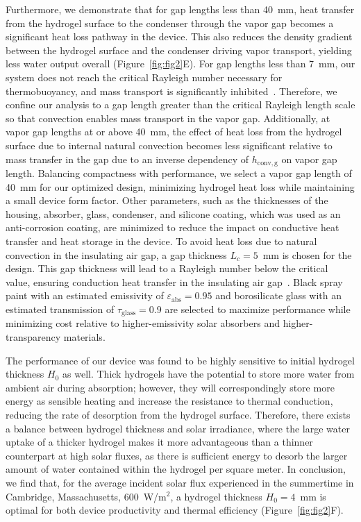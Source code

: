 \documentclass[11pt]{article}
\begin{document}
Furthermore, we demonstrate that for gap lengths less than 40~mm, heat transfer from the hydrogel surface to the condenser through the vapor gap becomes a significant heat loss pathway in the device. This also reduces the density gradient between the hydrogel surface and the condenser driving vapor transport, yielding less water output overall (Figure~\ref{fig:fig2}E). For gap lengths less than 7~mm, our system does not reach the critical Rayleigh number necessary for thermobuoyancy, and mass transport is significantly inhibited~\cite{hollands1976}. Therefore, we confine our analysis to a gap length greater than the critical Rayleigh length scale so that convection enables mass transport in the vapor gap. Additionally, at vapor gap lengths at or above 40~mm, the effect of heat loss from the hydrogel surface due to internal natural convection becomes less significant relative to mass transfer in the gap due to an inverse dependency of $h_{\mathrm{conv,g}}$ on vapor gap length. Balancing compactness with performance, we select a vapor gap length of 40~mm for our optimized design, minimizing hydrogel heat loss while maintaining a small device form factor. Other parameters, such as the thicknesses of the housing, absorber, glass, condenser, and silicone coating, which was used as an anti-corrosion coating, are minimized to reduce the impact on conductive heat transfer and heat storage in the device. To avoid heat loss due to natural convection in the insulating air gap, a gap thickness $L_c = 5$~mm is chosen for the design. This gap thickness will lead to a Rayleigh number below the critical value, ensuring conduction heat transfer in the insulating air gap~\cite{hollands1976}. Black spray paint with an estimated emissivity of $\varepsilon_{\mathrm{abs}} = 0.95$ and borosilicate glass with an estimated transmission of $\tau_{\mathrm{glass}} = 0.9$ are selected to maximize performance while minimizing cost relative to higher-emissivity solar absorbers and higher-transparency materials.

The performance of our device was found to be highly sensitive to initial hydrogel thickness $H_0$ as well. Thick hydrogels have the potential to store more water from ambient air during absorption; however, they will correspondingly store more energy as sensible heating and increase the resistance to thermal conduction, reducing the rate of desorption from the hydrogel surface. Therefore, there exists a balance between hydrogel thickness and solar irradiance, where the large water uptake of a thicker hydrogel makes it more advantageous than a thinner counterpart at high solar fluxes, as there is sufficient energy to desorb the larger amount of water contained within the hydrogel per square meter. In conclusion, we find that, for the average incident solar flux experienced in the summertime in Cambridge, Massachusetts, 600~W/m$^2$, a hydrogel thickness $H_0 = 4$~mm is optimal for both device productivity and thermal efficiency (Figure~\ref{fig:fig2}F).
\end{document}
